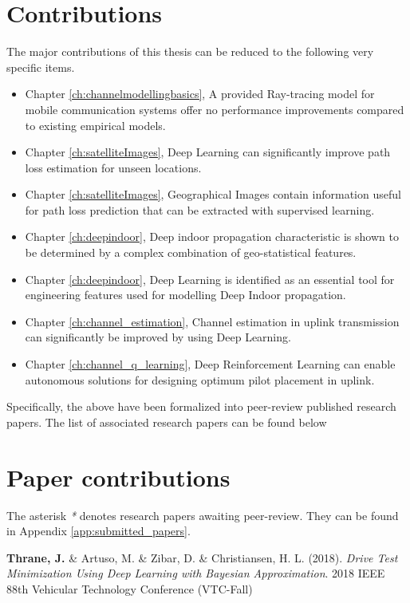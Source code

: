 \section*{Contributions}

The major contributions of this thesis can be reduced to the following very specific items. 

\begin{itemize}
    \item Chapter \ref{ch:channelmodellingbasics}, A provided Ray-tracing model for mobile communication systems offer no performance improvements compared to existing empirical models.
    \item Chapter \ref{ch:satelliteImages}, Deep Learning can significantly improve path loss estimation for unseen locations.
    \item Chapter \ref{ch:satelliteImages}, Geographical Images contain information useful for path loss prediction that can be extracted with supervised learning.
    \item Chapter \ref{ch:deepindoor}, Deep indoor propagation characteristic is shown to be determined by a complex combination of geo-statistical features.
    \item Chapter \ref{ch:deepindoor}, Deep Learning is identified as an essential tool for engineering features used for modelling Deep Indoor propagation.
    \item Chapter \ref{ch:channel_estimation}, Channel estimation in uplink transmission can significantly be improved by using Deep Learning.
    \item Chapter \ref{ch:channel_q_learning}, Deep Reinforcement Learning can enable autonomous solutions for designing optimum pilot placement in uplink.
\end{itemize}

\noindent Specifically, the above have been formalized into peer-review published research papers. The list of associated research papers can be found below


\section*{Paper contributions}

The asterisk \emph{*} denotes research papers awaiting peer-review. They can be found in Appendix \ref{app:submitted_papers}.

\vspace{2em}

\noindent \textbf{Thrane, J.} \&  Artuso, M. \&  Zibar, D. \&  Christiansen, H. L. (2018). \textit{Drive Test Minimization Using Deep Learning with Bayesian Approximation}. 2018 IEEE 88th Vehicular Technology Conference (VTC-Fall) \cite{Thrane2018DriveApproximation}

